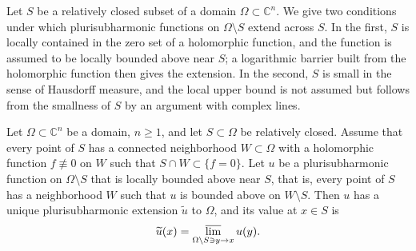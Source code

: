 Let $S$ be a relatively closed subset of a domain $\Omega\subset\mathbb{C}^n$. We give two conditions under which plurisubharmonic functions on $\Omega\setminus S$ extend across $S$. In the first, $S$ is locally contained in the zero set of a holomorphic function, and the function is assumed to be locally bounded above near $S$; a logarithmic barrier built from the holomorphic function then gives the extension. In the second, $S$ is small in the sense of Hausdorff measure, and the local upper bound is not assumed but follows from the smallness of $S$ by an argument with complex lines.

\begin{theorem}\label{thm:psh-bounded-zero-extension}
Let $\Omega\subset\mathbb{C}^n$ be a domain, $n\ge1$, and let $S\subset\Omega$ be relatively closed. Assume that every point of $S$ has a connected neighborhood $W\subset\Omega$ with a holomorphic function $f\not\equiv0$ on $W$ such that $S\cap W\subset\{f=0\}$. Let $u$ be a plurisubharmonic function on $\Omega\setminus S$ that is locally bounded above near $S$, that is, every point of $S$ has a neighborhood $W$ such that $u$ is bounded above on $W\setminus S$. Then $u$ has a unique plurisubharmonic extension $\widetilde u$ to $\Omega$, and its value at $x\in S$ is
\[
 \widetilde u(x)=\varlimsup_{\Omega\setminus S\ni y\to x}u(y).
\]
\end{theorem}
